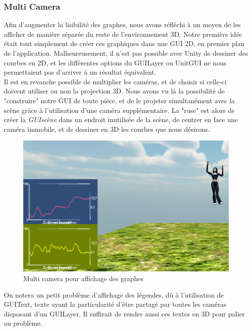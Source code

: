 \documentclass[french,12pt]{report}
\begin{document}
		\subsubsection{Multi Camera}
Afin d'augmenter la lisibilité des graphes, nous avons réfléchi à un moyen de les afficher de manière séparée du reste de
l'environnement 3D. Notre première idée était tout simplement de créer ces graphiques dans une GUI 2D, en premier
plan de l'application. Malheureusement, il n'est pas possible avec Unity de dessiner des courbes en 2D, et les différentes
options du GUILayer ou UnitGUI ne nous permettaient pas d'arriver à un résultat équivalent.\\
Il est en revanche possible de multiplier les caméras, et de choisir si celle-ci doivent utiliser ou non la projection 3D. Nous 
avons vu là la possibilité de "construire" notre GUI de toute pièce, et de le projeter simultanément avec la scène grâce à
l'utilisation d'une caméra supplémentaire. La "ruse" est alors de créer la  \textit{GUIscène} dans un endroit inutilisée de la 
scène, de centrer en face une caméra immobile, et de dessiner en 3D les courbes que nous désirons.
\begin{figure}
\begin{center}
	\includegraphics[scale=0.6]{images/multicamera.png} \caption{Multi camera pour affichage des graphes}
	\end{center}
\end{figure}
 On notera un petit problème d'affichage des légendes, dû à l'utilisation de GUIText, texte ayant la particularité d'être partagé par toutes les 
caméras disposant d'un GUILayer. Il suffirait de rendre aussi ces textes en 3D pour palier au problème.
\end{document}
